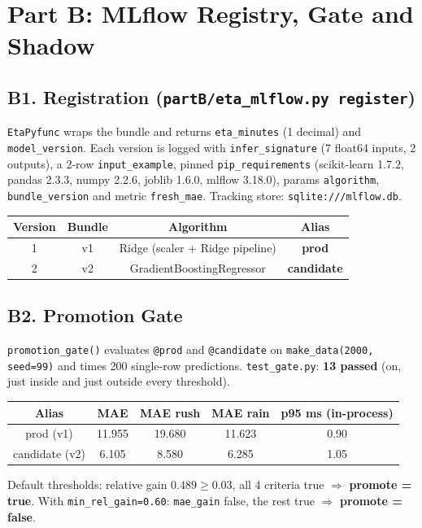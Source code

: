 \documentclass[10pt]{article}
\newcommand{\code}[1]{\texttt{#1}}
\begin{document}
\section{Part B: MLflow Registry, Gate and Shadow}

\subsection{B1. Registration (\code{partB/eta\_mlflow.py register})}
\code{EtaPyfunc} wraps the bundle and returns \code{eta\_minutes} (1 decimal) and \code{model\_version}. Each version is logged with
\code{infer\_signature} (7 float64 inputs, 2 outputs), a 2-row \code{input\_example}, pinned \code{pip\_requirements}
(scikit-learn 1.7.2, pandas 2.3.3, numpy 2.2.6, joblib 1.6.0, mlflow 3.18.0), params \code{algorithm}, \code{bundle\_version} and metric
\code{fresh\_mae}. Tracking store: \code{sqlite:///mlflow.db}.

\begin{center}
\begin{tabular}{|c|c|c|c|}
\hline
\textbf{Version} & \textbf{Bundle} & \textbf{Algorithm} & \textbf{Alias} \\ \hline
1 & v1 & Ridge (scaler + Ridge pipeline) & \textbf{prod} \\
2 & v2 & GradientBoostingRegressor & \textbf{candidate} \\ \hline
\end{tabular}
\end{center}

\subsection{B2. Promotion Gate}
\code{promotion\_gate()} evaluates \code{@prod} and \code{@candidate} on \code{make\_data(2000, seed=99)} and times 200
single-row predictions. \code{test\_gate.py}: \textbf{13 passed} (on, just inside and just outside every threshold).

\begin{center}
\begin{tabular}{|c|c|c|c|c|}
\hline
\textbf{Alias} & \textbf{MAE} & \textbf{MAE rush} & \textbf{MAE rain} & \textbf{p95 ms (in-process)} \\ \hline
prod (v1) & 11.955 & 19.680 & 11.623 & 0.90 \\
candidate (v2) & 6.105 & 8.580 & 6.285 & 1.05 \\ \hline
\end{tabular}
\end{center}
Default thresholds: relative gain $0.489 \ge 0.03$, all 4 criteria true $\Rightarrow$ \textbf{promote = true}.
With \code{min\_rel\_gain=0.60}: \code{mae\_gain} false, the rest true $\Rightarrow$ \textbf{promote = false}.
\end{document}
